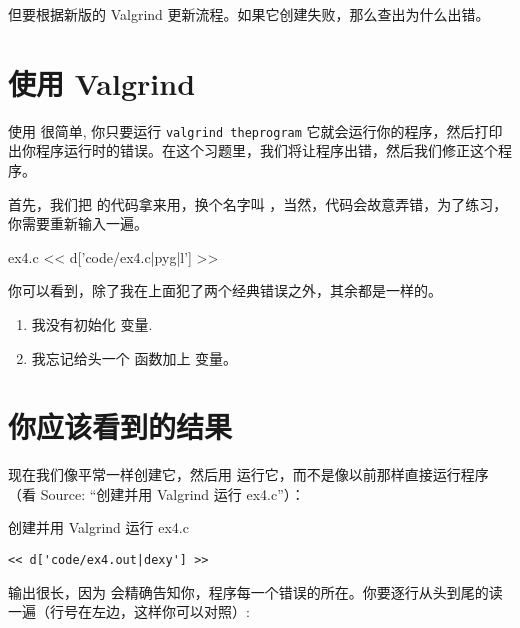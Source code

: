 但要根据新版的 Valgrind 更新流程。如果它创建失败，那么查出为什么出错。

\section{ 使用 Valgrind}

使用  很简单, 你只要运行 \verb|valgrind theprogram| 它就会运行你的程序，然后打印出你程序运行时的错误。在这个习题里，我们将让程序出错，然后我们修正这个程序。

 首先，我们把  的代码拿来用，换个名字叫  ，当然，代码会故意弄错，为了练习，你需要重新输入一遍。

\begin{code}{ex4.c}
<< d['code/ex4.c|pyg|l'] >>
\end{code}

你可以看到，除了我在上面犯了两个经典错误之外，其余都是一样的。

\begin{enumerate}
\item 我没有初始化  变量.
\item 我忘记给头一个  函数加上  变量。
\end{enumerate}

\section{你应该看到的结果}

现在我们像平常一样创建它，然后用  运行它，而不是像以前那样直接运行程序（看 Source: “创建并用 Valgrind 运行 ex4.c”）：

\begin{Terminal}{创建并用 Valgrind 运行 ex4.c}
\begin{lstlisting}
<< d['code/ex4.out|dexy'] >>
\end{lstlisting}
\end{Terminal}

输出很长，因为  会精确告知你，程序每一个错误的所在。你要逐行从头到尾的读一遍（行号在左边，这样你可以对照）:

